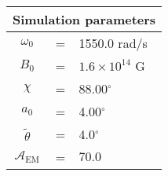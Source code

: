 \begin{tabular}{ccl}
\multicolumn{3}{c}{Simulation parameters} \\
\hline
$\omega_0$  &=& 1550.0 rad/s\\
$B_0$  &=& ${1.6}\times 10^{14}$ G \\
$\chi$  &=& 88.00$^{\circ}$ \\
$a_0$ &=& 4.00$^{\circ}$ \\
$\tilde{\theta}$ &= & 4.0$^{\circ}$ \\
$\mathcal{A}_{\mathrm{EM}}$ &= & $70.0$
\end{tabular}
